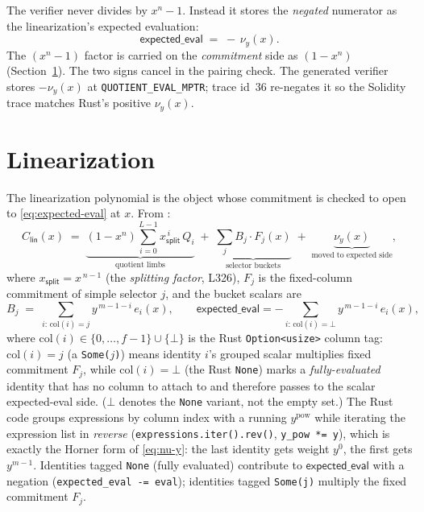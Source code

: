 \begin{definition}
\label{def:neg-numer}
The verifier never divides by $x^n - 1$. Instead it stores the
\emph{negated} numerator as the linearization's expected evaluation:
\begin{equation}
  \mathsf{expected\_\allowbreak{}eval} \;=\; -\,\nu_y(x).
  \label{eq:expected-eval}
\end{equation}
The $(x^n - 1)$ factor is carried on the \emph{commitment} side as
$(1 - x^n)$ (Section~\ref{sec:linearization}). The two signs cancel in the
pairing check. The generated verifier stores $-\nu_y(x)$ at
\texttt{QUOTIENT\_\allowbreak{}EVAL\_\allowbreak{}MPTR}; trace id~36 re-negates it so the Solidity
trace matches Rust's positive $\nu_y(x)$.
\end{definition}

\section{Linearization}
\label{sec:linearization}

The linearization polynomial is the object whose commitment is checked to
open to \eqref{eq:expected-eval} at $x$. From
:
\begin{equation}
  C_{\mathsf{lin}}(x) \;=\;
     \underbrace{(1 - x^n)\sum_{i=0}^{L-1} x_{\mathsf{split}}^{\,i}\, Q_i}_{\text{quotient limbs}}
   \;+\; \underbrace{\sum_{j} B_j \cdot F_j(x)}_{\text{selector buckets}}
   \;+\; \underbrace{\nu_y(x)}_{\text{moved to expected side}},
  \label{eq:linearization}
\end{equation}
where $x_{\mathsf{split}} = x^{\,n-1}$ (the \emph{splitting factor},
 L326), $F_j$ is the fixed-column commitment of simple
selector $j$, and the bucket scalars are
\begin{equation}
  B_j \;=\; \sum_{i:\,\mathrm{col}(i)=j} y^{\,m-1-i}\, e_i(x),
  \qquad
  \mathsf{expected\_\allowbreak{}eval} = -\!\!\sum_{i:\,\mathrm{col}(i)=\bot}\!\! y^{\,m-1-i}\, e_i(x),
  \label{eq:buckets}
\end{equation}
where $\mathrm{col}(i)\in\{0,\ldots,f{-}1\}\cup\{\bot\}$ is the Rust
\texttt{Option<usize>} column tag: $\mathrm{col}(i)=j$ (a
\texttt{Some($j$)}) means identity $i$'s grouped scalar multiplies fixed
commitment $F_j$, while $\mathrm{col}(i)=\bot$ (the Rust \texttt{None})
marks a \emph{fully-evaluated} identity that has no column to attach to
and therefore passes to the scalar expected-eval side. ($\bot$ denotes
the \texttt{None} variant, not the empty set.)
The Rust code groups expressions by column index with a running
$y^{\text{pow}}$ while iterating the expression list in \emph{reverse}
(\texttt{expressions.iter().rev()}, \texttt{y\_\allowbreak{}pow *= y}), which is exactly
the Horner form of \eqref{eq:nu-y}: the last identity gets weight $y^0$,
the first gets $y^{m-1}$. Identities tagged \texttt{None} (fully evaluated)
contribute to $\mathsf{expected\_\allowbreak{}eval}$ with a negation
(\texttt{expected\_\allowbreak{}eval -= eval}); identities tagged \texttt{Some(j)}
multiply the fixed commitment $F_j$.

